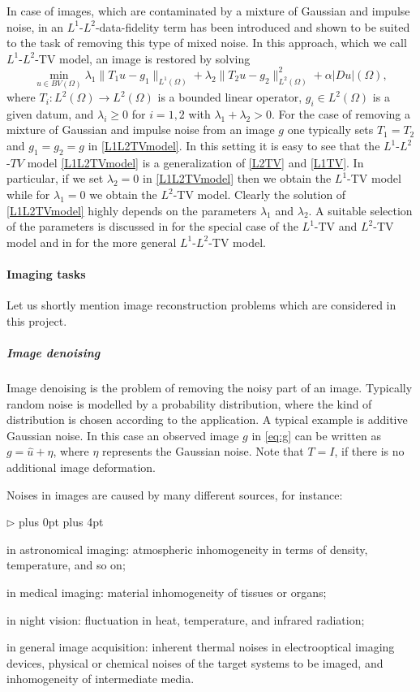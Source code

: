 \documentclass[enabledeprecatedfontcommands,cleardoublepage=empty,headsepline,twoside,11pt,DIV=15,BCOR=12mm,final]{scrartcl}
\renewenvironment{itemize}
{\begin{list}{$\triangleright$}{\labelwidth-2mm \leftmargin3mm %
  \itemsep5pt plus 0pt  \topsep3pt \parsep1pt plus 4pt \labelsep2mm}}
{\end{list}}
\begin{document}
In case of images, which are contaminated by a mixture of Gaussian and impulse noise, in \cite{HintermullerLanger:13} an $L^1$-$L^2$-data-fidelity term has been introduced and shown to be suited to the task of removing this type of mixed noise. In this approach, which we call $L^1$-$L^2$-TV model, an image is restored by solving
\begin{equation}\label{L1L2TVmodel}
\min_{u\in BV(\Omega)} \lambda_1 \|T_1u-g_1\|_{L^1(\Omega)} +  \lambda_2 \|T_2 u-g_2\|_{L^2(\Omega)}^2 + \alpha |Du|(\Omega),
\end{equation}
where $T_i : L^2(\Omega) \to L^2(\Omega)$ is a bounded linear operator, $g_i\in L^2(\Omega)$ is a given datum, and $\lambda_i\geq 0$ for $i=1,2$ with $\lambda_1+\lambda_2>0$. For the case of removing a mixture of Gaussian and impulse noise from an image $g$ one typically sets $T_1=T_2$ and $g_1=g_2=g$ in \eqref{L1L2TVmodel}. In this setting it is easy to see that the $L^1$-$L^2$-$TV$ model \eqref{L1L2TVmodel} is a generalization of \eqref{L2TV} and \eqref{L1TV}. In particular, if we set $\lambda_2=0$ in \eqref{L1L2TVmodel} then we obtain the $L^1$-TV model while for $\lambda_1=0$ we obtain the $L^2$-TV model. Clearly the solution of \eqref{L1L2TVmodel} highly depends on the parameters $\lambda_1$ and $\lambda_2$. A suitable selection of the parameters is discussed in \cite{Lan2015} for the special case of the $L^1$-TV and $L^2$-TV model and in \cite{Lan2016} for the more general $L^1$-$L^2$-TV model.

\paragraph{Imaging tasks}

Let us shortly mention image reconstruction problems which are considered in this project.

\subparagraph{Image denoising}

Image denoising is the problem of removing the noisy part of an image. Typically random noise is modelled by a probability distribution, where the kind of distribution is chosen according to the application. A typical example is additive Gaussian noise. In this case an observed image $g$ in \ref{eq:g} can be written as $g = \hat{u} + \eta$, where $\eta$ represents the Gaussian noise. Note that $T=I$, if there is no additional image deformation.

Noises in images are caused by many different sources, for instance:
\begin{itemize}
\item in astronomical imaging: atmospheric inhomogeneity in terms of density, temperature, and so on;
\item in medical imaging: material inhomogeneity of tissues or organs;
\item in night vision: fluctuation in heat, temperature, and infrared radiation;
\item in general image acquisition: inherent thermal noises in electrooptical imaging devices, physical or chemical noises of the target systems to be imaged, and inhomogeneity of intermediate media.
\end{itemize}
\end{document}
